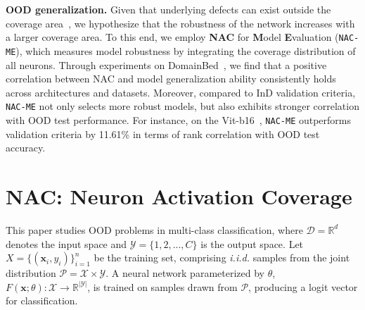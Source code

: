 \documentclass{article} \usepackage{iclr2024_conference,times}
\newcommand{\bfstart}[1]{\noindent\textbf{#1.}}
\begin{document}
\bfstart{OOD generalization} 
Given that underlying defects can exist outside the coverage area~\citep{NACT_System:DeepXplore}, we hypothesize that the robustness of the network increases with a larger coverage area.
To this end, we employ \textbf{NAC} for \textbf{M}odel \textbf{E}valuation (\texttt{NAC-ME}), which measures model robustness by integrating the coverage distribution of all neurons.
Through experiments on DomainBed~\citep{Setup:DomainBed}, we find that a positive correlation between NAC and model generalization ability consistently holds across architectures and datasets. 
Moreover, compared to InD validation criteria, \texttt{NAC-ME} not only selects more robust models, but also exhibits stronger correlation with OOD test performance.
For instance, on the Vit-b16~\citep{tech:ViT}, \texttt{NAC-ME} outperforms validation criteria by 11.61\% in terms of rank correlation with OOD test accuracy.











































































\section{NAC: Neuron Activation Coverage}
\vspace{-1mm}
\label{Sec:Method_Pre}
This paper studies OOD problems in multi-class classification, where $\mathcal{D}=\mathbb{R}^d$ denotes the input space and $\mathcal{Y}=\{1,2,...,C\}$ is the output space.
Let $X = \{(\mathbf{x}_i,y_i)\}_{i=1}^{n}$ be the training set, comprising \textit{i.i.d.} samples from the joint distribution $\mathcal{P} = \mathcal{X} \times \mathcal{Y}$. 
A neural network parameterized by $\theta$, $F(\mathbf{x}; \theta): \mathcal{X} \rightarrow \mathbb{R}^{|\mathcal{Y}|}$, is trained on samples drawn from $\mathcal{P}$, producing a logit vector for classification.
\end{document}
